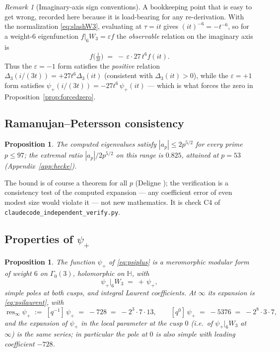 \documentclass[11pt,reqno]{amsart}
\theoremstyle{plain}
\newtheorem{proposition}[theorem]{Proposition}
\theoremstyle{definition}
\theoremstyle{remark}
\newtheorem{remark}[theorem]{Remark}
\newcommand{\HH}{\mathbb{H}}
\newcommand{\eps}{\varepsilon}
\newcommand{\Dthree}{\Delta_{3}}
\newcommand{\psip}{\psi_{+}}
\DeclareMathOperator{\res}{res}
\begin{document}
\begin{remark}[Imaginary-axis sign conventions]\label{rem:signs}
A bookkeeping point that is easy to get wrong, recorded here because
it is load-bearing for any re-derivation.  With the normalization
\eqref{eq:slashW3}, evaluating at $\tau=it$ gives
$(it)^{-6}=-t^{-6}$, so for a weight-$6$ eigenfunction
$f|_6W_3=\eps f$ the \emph{observable} relation on the imaginary axis
is
\[
f\!\big(\tfrac{i}{3t}\big)\;=\;-\,\eps\cdot 27\,t^6 f(it).
\]
Thus the $\eps=-1$ form satisfies the \emph{positive} relation
$\Dthree(i/(3t))=+27t^6\Dthree(it)$ (consistent with
$\Dthree(it)>0$), while the $\eps=+1$ form satisfies
$\psip(i/(3t))=-27t^6\,\psip(it)$ --- which is what forces the zero in
Proposition~\ref{prop:forcedzero}.
\end{remark}

\subsection{Ramanujan--Petersson consistency}

\begin{proposition}\label{prop:RP}
The computed eigenvalues satisfy $|a_p|\le 2p^{5/2}$ for every prime
$p\le97$; the extremal ratio $|a_p|/2p^{5/2}$ on this range is
$0.825$, attained at $p=53$ (Appendix~\ref{app:hecke}).
\end{proposition}

The bound is of course a theorem for all $p$ (Deligne
\cite{Deligne1974}); the verification is a consistency test of the
computed expansion --- any coefficient error of even modest size would
violate it --- not new mathematics.  It is check C4 of
\texttt{claudecode\_independent\_verify.py}.

\subsection{Properties of \texorpdfstring{$\psip$}{psi+}}

\begin{proposition}\label{prop:psiplus}
The function $\psip$ of \eqref{eq:psiplus} is a meromorphic modular
form of weight $6$ on $\Gamma_0(3)$, holomorphic on $\HH$, with
\[
\psip|_6W_3\;=\;+\,\psip ,
\]
simple poles at both cusps, and integral Laurent coefficients.  At
$\infty$ its expansion is \eqref{eq:psilaurent}, with
\[
\res_{\infty}\psip\;:=\;[q^{-1}]\,\psip\;=\;-728\;=\;-2^3\cdot7\cdot13,
\qquad
[q^{0}]\,\psip\;=\;-5376\;=\;-2^8\cdot3\cdot7 ,
\]
and the expansion of $\psip$ in the local parameter at the cusp $0$
(i.e.\ of $\psip|_6W_3$ at $\infty$) is the same series; in particular
the pole at $0$ is also simple with leading coefficient $-728$.
\end{proposition}
\end{document}

